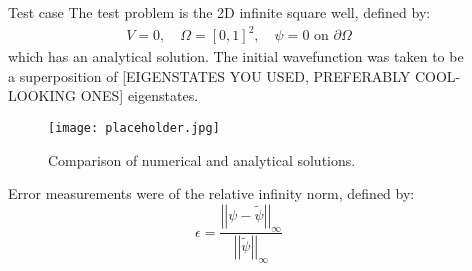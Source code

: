 \documentclass[final]{beamer}
\newlength{\sepwid}
\newlength{\onecolwid}
\newlength{\twocolwid}
\begin{document}
\begin{frame}[t]
\begin{columns}[t]
\begin{column}{\onecolwid}
\end{column} %

\begin{column}{\sepwid}\end{column} %

\begin{column}{\twocolwid} %

\begin{columns}[t,totalwidth=\twocolwid] %

\begin{column}{\onecolwid}\vspace{-.6in} %

\begin{block}{Test case}
The test problem is the 2D infinite square well, defined by:
\begin{gather}
V=0,\quad\Omega=\left[0,1\right]^{2},\quad\psi = 0\text{ on } \partial\Omega
\end{gather}
which has an analytical solution. The initial wavefunction was taken to be a superposition of [EIGENSTATES YOU USED, PREFERABLY COOL-LOOKING ONES] eigenstates.

\begin{figure}[H]
\texttt{[image: placeholder.jpg]}
\caption{Comparison of numerical and analytical solutions.}
\end{figure}
Error measurements were of the relative infinity norm, defined by:
\begin{equation}
\epsilon=\frac{\left|\left|\psi-\tilde{\psi}\right|\right|_{\infty}}{\left|\left|\tilde{\psi}\right|\right|_{\infty}}
\end{equation}


\end{block}
\end{column}
\end{columns}
\end{column}
\end{columns}
\end{frame}
\end{document}
